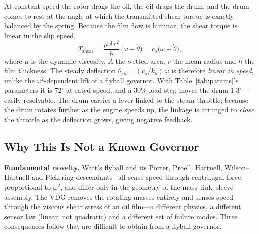 \documentclass[conference]{IEEEtran}
\newcommand{\dg}{\ensuremath{^{\circ}}}
\begin{document}
At constant speed the rotor drags the oil, the oil drags the drum, and the drum
comes to rest at the angle at which the transmitted shear torque is exactly balanced
by the spring. Because the film flow is laminar, the shear torque is linear in the
slip speed,
\begin{equation}
T_{\mathrm{shear}}=\frac{\mu A r^{2}}{h}\,\bigl(\omega-\dot\theta\bigr)
= c_s\bigl(\omega-\dot\theta\bigr),
\label{eq:newton}
\end{equation}
where $\mu$ is the dynamic viscosity, $A$ the wetted area, $r$ the mean radius and
$h$ the film thickness. The steady deflection $\theta_{ss}=(c_s/k_s)\,\omega$ is
therefore \emph{linear in speed}, unlike the $\omega^{2}$-dependent lift of a
flyball governor. With Table~\ref{tab:params}'s parameters it is $72\dg$ at rated
speed, and a $30\%$ load step moves the drum $1.3\dg$---easily resolvable. The drum
carries a lever linked to the steam throttle; because the drum rotates further as
the engine speeds up, the linkage is arranged to \emph{close} the throttle as the
deflection grows, giving negative feedback.

\subsection{Why This Is Not a Known Governor}
\textbf{Fundamental novelty.} Watt's flyball and its Porter, Proell, Hartnell,
Wilson--Hartnell and Pickering descendants~\cite{bennett} all sense speed through
centrifugal force, proportional to $\omega^{2}$, and differ only in the geometry of
the mass--link--sleeve assembly. The VDG removes the rotating masses entirely and
senses speed through the viscous shear stress of an oil film---a different physics,
a different sensor law (linear, not quadratic) and a different set of failure modes.
Three consequences follow that are difficult to obtain from a flyball governor.
\end{document}
